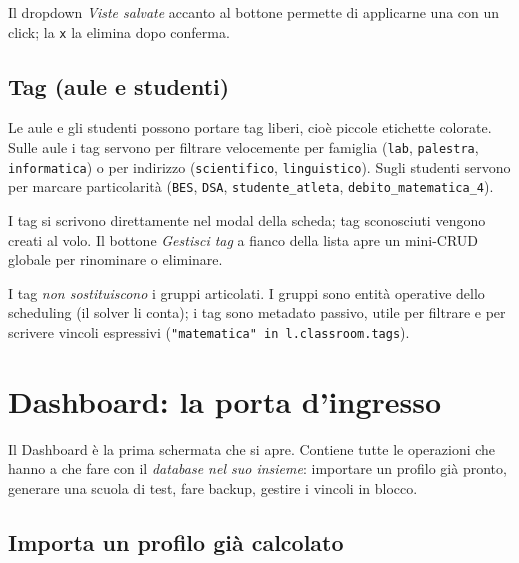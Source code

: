 Il dropdown \emph{Viste salvate} accanto al bottone permette di
applicarne una con un click; la \texttt{x} la elimina dopo
conferma.

\subsection{Tag (aule e studenti)}

Le aule e gli studenti possono portare tag liberi, cio\`e piccole
etichette colorate. Sulle aule i tag servono per filtrare
velocemente per famiglia (\texttt{lab}, \texttt{palestra},
\texttt{informatica}) o per indirizzo (\texttt{scientifico},
\texttt{linguistico}). Sugli studenti servono per marcare
particolarit\`a (\texttt{BES}, \texttt{DSA},
\texttt{studente\_atleta}, \texttt{debito\_matematica\_4}).

I tag si scrivono direttamente nel modal della scheda; tag
sconosciuti vengono creati al volo. Il bottone \emph{Gestisci
tag} a fianco della lista apre un mini-CRUD globale per
rinominare o eliminare.

\begin{ideabox}
I tag \emph{non sostituiscono} i gruppi articolati. I gruppi
sono entit\`a operative dello scheduling (il solver li conta);
i tag sono metadato passivo, utile per filtrare e per scrivere
vincoli espressivi (\texttt{"matematica" in l.classroom.tags}).
\end{ideabox}



\section{Dashboard: la porta d'ingresso}
\label{sec:tab_dashboard}

Il Dashboard \`e la prima schermata che si apre. Contiene tutte
le operazioni che hanno a che fare con il \emph{database nel suo
insieme}: importare un profilo gi\`a pronto, generare una scuola
di test, fare backup, gestire i vincoli in blocco.

\subsection{Importa un profilo gi\`a calcolato}

